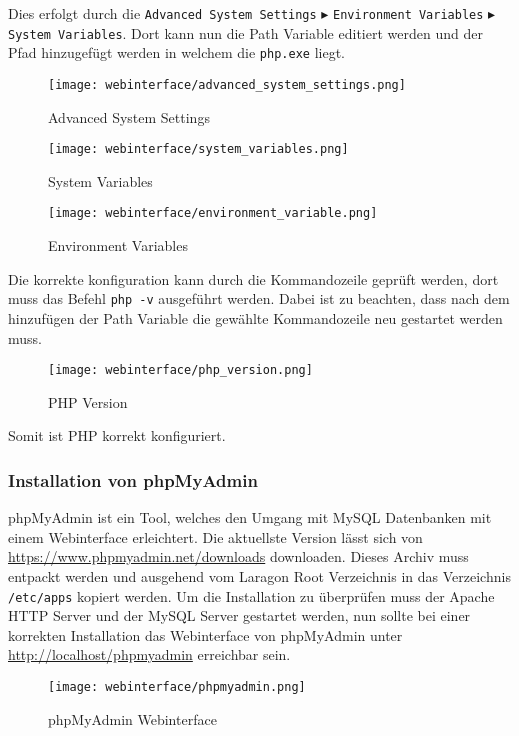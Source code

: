 Dies erfolgt durch die \verb|Advanced System Settings| $\blacktriangleright$
\verb|Environment Variables| $\blacktriangleright$ \verb|System Variables|.
Dort kann nun die Path Variable editiert werden und der Pfad hinzugefügt werden
in welchem die \verb|php.exe| liegt.

\begin{figure}[H]
  \centering
  \texttt{[image: webinterface/advanced\_system\_settings.png]}
  \caption{Advanced System Settings}
\end{figure}

\begin{figure}[H]
  \centering
  \texttt{[image: webinterface/system\_variables.png]}
  \caption{System Variables}
\end{figure}

\begin{figure}[H]
  \centering
  \texttt{[image: webinterface/environment\_variable.png]}
  \caption{Environment Variables}
\end{figure}

Die korrekte konfiguration kann durch die Kommandozeile geprüft werden, dort
muss das Befehl \verb|php -v| ausgeführt werden. Dabei ist zu beachten, dass
nach dem hinzufügen der Path Variable die gewählte Kommandozeile neu gestartet
werden muss.

\begin{figure}[H]
  \centering
  \texttt{[image: webinterface/php\_version.png]}
  \caption{PHP Version}
\end{figure}

Somit ist PHP korrekt konfiguriert.


\subsubsection{Installation von phpMyAdmin}
phpMyAdmin ist ein Tool, welches den Umgang mit MySQL Datenbanken mit einem
Webinterface erleichtert. Die aktuellste Version lässt sich von
\url{https://www.phpmyadmin.net/downloads} downloaden. Dieses Archiv muss
entpackt werden und ausgehend vom Laragon Root Verzeichnis in das Verzeichnis
\verb|/etc/apps| kopiert werden. Um die Installation zu überprüfen muss der
Apache HTTP Server und der MySQL Server gestartet werden, nun sollte bei einer
korrekten Installation das Webinterface von phpMyAdmin unter
\url{http://localhost/phpmyadmin} erreichbar sein.

\begin{figure}[H]
  \centering
  \texttt{[image: webinterface/phpmyadmin.png]}
  \caption{phpMyAdmin Webinterface}
\end{figure}

